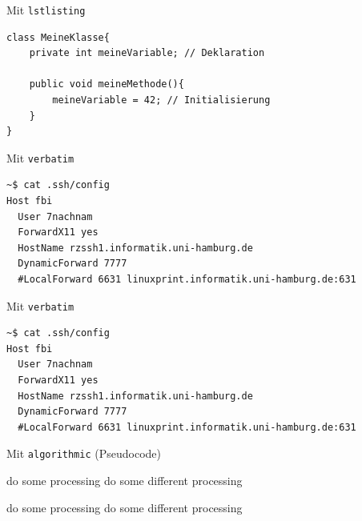 \documentclass{beamer}
\begin{document}

		\begin{frame}[containsverbatim]{Mit \texttt{lstlisting}}
			\begin{lstlisting}[caption=Deklaration und Initialisierung von Variablen]
class MeineKlasse{
	private int meineVariable; // Deklaration

	public void meineMethode(){
		meineVariable = 42; // Initialisierung
	}
}
			\end{lstlisting}
		\end{frame}

		
		\begin{frame}[containsverbatim]{Mit \texttt{verbatim}}
			\begin{smallerlatexcode}
\begin{verbatim}
~$ cat .ssh/config
Host fbi
  User 7nachnam
  ForwardX11 yes
  HostName rzssh1.informatik.uni-hamburg.de
  DynamicForward 7777
  #LocalForward 6631 linuxprint.informatik.uni-hamburg.de:631
\end{verbatim}
			\end{smallerlatexcode}
		\end{frame}


		\begin{frame}[containsverbatim]{Mit \texttt{verbatim}}
{
\small
			\begin{verbatim}
~$ cat .ssh/config
Host fbi
  User 7nachnam
  ForwardX11 yes
  HostName rzssh1.informatik.uni-hamburg.de
  DynamicForward 7777
  #LocalForward 6631 linuxprint.informatik.uni-hamburg.de:631			
			\end{verbatim}
}

		\end{frame}		

		
		\begin{frame}[containsverbatim]{Mit \texttt{algorithmic} (Pseudocode)}
			\begin{smalllatexcode}
\begin{algorithmic}
        \STATE do some processing
        \STATE do some different processing
    \ENDIF
\end{algorithmic}
			\end{smalllatexcode}

\begin{algorithmic}
        \STATE do some processing
        \STATE do some different processing
    \ENDIF
\end{algorithmic}

		\end{frame}
\end{document}
